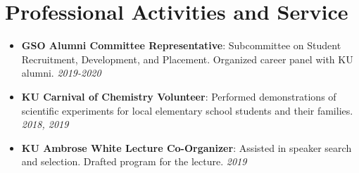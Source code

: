 \documentclass[a4paper,20pt]{article}
\newcommand{\resumeItem}[2]{
  \item\small{
    \textbf{#1}{: #2 \vspace{-2pt}}
  }
}
\newcommand{\resumeSubItem}[2]{\resumeItem{#1}{#2}\vspace{-3pt}}
\newcommand{\resumeSubHeadingListStart}{\begin{itemize}[leftmargin=*]}
\newcommand{\resumeSubHeadingListEnd}{\end{itemize}}
\begin{document}
\section{Professional Activities and Service}
  \resumeSubHeadingListStart
	\resumeSubItem{GSO Alumni Committee Representative}
    {Subcommittee on Student Recruitment, Development, and Placement. Organized career panel with KU alumni. \textit{2019-2020}}
    \resumeSubItem{KU Carnival of Chemistry Volunteer}
    {Performed demonstrations of scientific experiments for local elementary school students and their families. \textit{2018, 2019}}
    \resumeSubItem{KU Ambrose White Lecture Co-Organizer}
    {Assisted in speaker search and selection. Drafted program for the lecture. \textit{2019}}

\resumeSubHeadingListEnd
\end{document}
